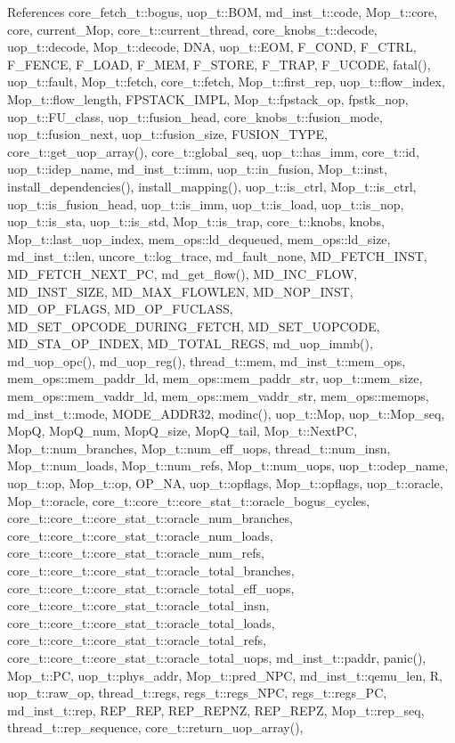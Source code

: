 References core\_\-fetch\_\-t::bogus, uop\_\-t::BOM, md\_\-inst\_\-t::code, Mop\_\-t::core, core, current\_\-Mop, core\_\-t::current\_\-thread, core\_\-knobs\_\-t::decode, uop\_\-t::decode, Mop\_\-t::decode, DNA, uop\_\-t::EOM, F\_\-COND, F\_\-CTRL, F\_\-FENCE, F\_\-LOAD, F\_\-MEM, F\_\-STORE, F\_\-TRAP, F\_\-UCODE, fatal(), uop\_\-t::fault, Mop\_\-t::fetch, core\_\-t::fetch, Mop\_\-t::first\_\-rep, uop\_\-t::flow\_\-index, Mop\_\-t::flow\_\-length, FPSTACK\_\-IMPL, Mop\_\-t::fpstack\_\-op, fpstk\_\-nop, uop\_\-t::FU\_\-class, uop\_\-t::fusion\_\-head, core\_\-knobs\_\-t::fusion\_\-mode, uop\_\-t::fusion\_\-next, uop\_\-t::fusion\_\-size, FUSION\_\-TYPE, core\_\-t::get\_\-uop\_\-array(), core\_\-t::global\_\-seq, uop\_\-t::has\_\-imm, core\_\-t::id, uop\_\-t::idep\_\-name, md\_\-inst\_\-t::imm, uop\_\-t::in\_\-fusion, Mop\_\-t::inst, install\_\-dependencies(), install\_\-mapping(), uop\_\-t::is\_\-ctrl, Mop\_\-t::is\_\-ctrl, uop\_\-t::is\_\-fusion\_\-head, uop\_\-t::is\_\-imm, uop\_\-t::is\_\-load, uop\_\-t::is\_\-nop, uop\_\-t::is\_\-sta, uop\_\-t::is\_\-std, Mop\_\-t::is\_\-trap, core\_\-t::knobs, knobs, Mop\_\-t::last\_\-uop\_\-index, mem\_\-ops::ld\_\-dequeued, mem\_\-ops::ld\_\-size, md\_\-inst\_\-t::len, uncore\_\-t::log\_\-trace, md\_\-fault\_\-none, MD\_\-FETCH\_\-INST, MD\_\-FETCH\_\-NEXT\_\-PC, md\_\-get\_\-flow(), MD\_\-INC\_\-FLOW, MD\_\-INST\_\-SIZE, MD\_\-MAX\_\-FLOWLEN, MD\_\-NOP\_\-INST, MD\_\-OP\_\-FLAGS, MD\_\-OP\_\-FUCLASS, MD\_\-SET\_\-OPCODE\_\-DURING\_\-FETCH, MD\_\-SET\_\-UOPCODE, MD\_\-STA\_\-OP\_\-INDEX, MD\_\-TOTAL\_\-REGS, md\_\-uop\_\-immb(), md\_\-uop\_\-opc(), md\_\-uop\_\-reg(), thread\_\-t::mem, md\_\-inst\_\-t::mem\_\-ops, mem\_\-ops::mem\_\-paddr\_\-ld, mem\_\-ops::mem\_\-paddr\_\-str, uop\_\-t::mem\_\-size, mem\_\-ops::mem\_\-vaddr\_\-ld, mem\_\-ops::mem\_\-vaddr\_\-str, mem\_\-ops::memops, md\_\-inst\_\-t::mode, MODE\_\-ADDR32, modinc(), uop\_\-t::Mop, uop\_\-t::Mop\_\-seq, MopQ, MopQ\_\-num, MopQ\_\-size, MopQ\_\-tail, Mop\_\-t::NextPC, Mop\_\-t::num\_\-branches, Mop\_\-t::num\_\-eff\_\-uops, thread\_\-t::num\_\-insn, Mop\_\-t::num\_\-loads, Mop\_\-t::num\_\-refs, Mop\_\-t::num\_\-uops, uop\_\-t::odep\_\-name, uop\_\-t::op, Mop\_\-t::op, OP\_\-NA, uop\_\-t::opflags, Mop\_\-t::opflags, uop\_\-t::oracle, Mop\_\-t::oracle, core\_\-t::core\_\-t::core\_\-stat\_\-t::oracle\_\-bogus\_\-cycles, core\_\-t::core\_\-t::core\_\-stat\_\-t::oracle\_\-num\_\-branches, core\_\-t::core\_\-t::core\_\-stat\_\-t::oracle\_\-num\_\-loads, core\_\-t::core\_\-t::core\_\-stat\_\-t::oracle\_\-num\_\-refs, core\_\-t::core\_\-t::core\_\-stat\_\-t::oracle\_\-total\_\-branches, core\_\-t::core\_\-t::core\_\-stat\_\-t::oracle\_\-total\_\-eff\_\-uops, core\_\-t::core\_\-t::core\_\-stat\_\-t::oracle\_\-total\_\-insn, core\_\-t::core\_\-t::core\_\-stat\_\-t::oracle\_\-total\_\-loads, core\_\-t::core\_\-t::core\_\-stat\_\-t::oracle\_\-total\_\-refs, core\_\-t::core\_\-t::core\_\-stat\_\-t::oracle\_\-total\_\-uops, md\_\-inst\_\-t::paddr, panic(), Mop\_\-t::PC, uop\_\-t::phys\_\-addr, Mop\_\-t::pred\_\-NPC, md\_\-inst\_\-t::qemu\_\-len, R, uop\_\-t::raw\_\-op, thread\_\-t::regs, regs\_\-t::regs\_\-NPC, regs\_\-t::regs\_\-PC, md\_\-inst\_\-t::rep, REP\_\-REP, REP\_\-REPNZ, REP\_\-REPZ, Mop\_\-t::rep\_\-seq, thread\_\-t::rep\_\-sequence, core\_\-t::return\_\-uop\_\-array(), 